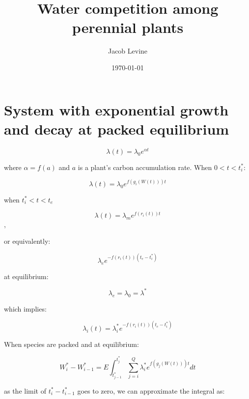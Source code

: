 \documentclass[11pt]{article}
\author{Jacob Levine}
\date{\today}
\title{Water competition among perennial plants}
\begin{document}
\maketitle
\tableofcontents




\section{System with exponential growth and decay at packed equilibrium}
\label{sec:orgf24b87e}


\begin{equation}
 \lambda(t) =  \lambda_{0}e^{\alpha t}
\end{equation}

where \(\alpha = f(a)\) and \(a\) is a plant's carbon accumulation rate. When \(0 < t < t_{i}^{*}\):

\begin{equation*}
  \lambda(t) = \lambda_{0}e^{f(g_{i}(W(t))) t}
\end{equation*}

when \(t_{i}^{*} < t < t_{e}\)

\begin{equation*}
  \lambda(t) = \lambda_{m}e^{f(r_{i}(t)) t}
\end{equation*},

or equivalently:

\begin{equation*}
  \lambda_{e}e^{-f(r_{i}(t)) (t_e - t_{i}^{*})}
\end{equation*}

at equilibrium:

\begin{equation*}
  \lambda_{e} = \lambda_{0} = \lambda^{*}
\end{equation*}

which implies:

\begin{equation*}
  \lambda_{i}(t) = \lambda_{i}^{*}e^{-f(r_{i}(t))(t_{e} - t_{i}^{*})}
\end{equation*}

When species are packed and at equilibrium:

\begin{equation*}
  W_{i}^{*}-W_{i-1}^{*} = E \int_{t_{j-1}^{*}}^{t_{j}^{*}} \sum_{j=i}^{Q} \lambda_{i}^{*}e^{f(g_{j}(W(t))) t}dt
\end{equation*}

as the limit of \(t_{i}^{*} - t_{i-1}^{*}\) goes to zero, we can approximate the integral as:
\end{document}
